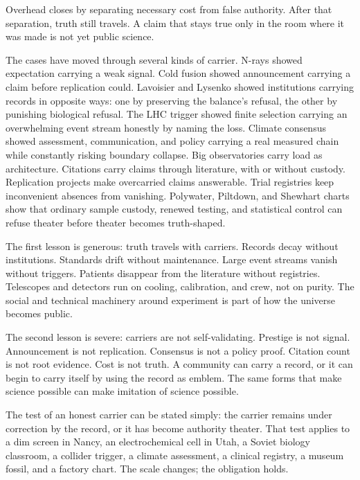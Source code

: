\begin{movementclose}
Overhead closes by separating necessary cost from false authority. After that
separation, truth still travels. A claim that stays true only in the room
where it was made is not yet public science.

The cases have moved through several kinds of carrier. N-rays showed
expectation carrying a weak signal. Cold fusion showed announcement carrying
a claim before replication could. Lavoisier and Lysenko showed institutions
carrying records in opposite ways: one by preserving the balance's refusal,
the other by punishing biological refusal. The LHC trigger showed finite
selection carrying an overwhelming event stream honestly by naming the loss.
Climate consensus showed assessment, communication, and policy carrying a
real measured chain while constantly risking boundary collapse. Big
observatories carry load as architecture. Citations carry claims through
literature, with or without custody. Replication projects make overcarried
claims answerable. Trial registries keep inconvenient absences from
vanishing. Polywater, Piltdown, and Shewhart charts show that ordinary
sample custody, renewed testing, and statistical control can refuse theater
before theater becomes truth-shaped.

The first lesson is generous: truth travels with carriers.
Records decay without institutions. Standards drift without maintenance.
Large event streams vanish without triggers. Patients disappear from the
literature without registries. Telescopes and detectors run on cooling,
calibration, and crew, not on purity. The social and technical machinery
around experiment is part of how the universe becomes public.

The second lesson is severe: carriers are not self-validating. Prestige is
not signal. Announcement is not replication. Consensus is not a policy
proof. Citation count is not root evidence. Cost is not truth. A community
can carry a record, or it can begin to carry itself by using the record as
emblem. The same forms that make science possible can make imitation of
science possible.

The test of an honest carrier can be stated simply: the carrier remains
under correction by the record, or it has become authority theater. That
test applies to a dim screen in Nancy, an electrochemical cell in Utah, a
Soviet biology classroom, a collider trigger, a climate assessment, a
clinical registry, a museum fossil, and a factory chart. The scale changes;
the obligation holds.


\end{movementclose}
